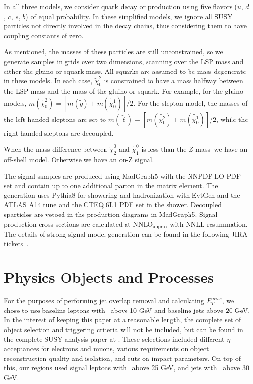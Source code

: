 In all three models, we consider quark decay or production using five flavors ($u$, $d$, $c$, $s$, $b$) of equal probability. In these simplified models, we ignore all SUSY particles not directly involved in the decay chains, thus considering them to have coupling constants of zero.

As mentioned, the masses of these particles are still unconstrained, so we generate samples in grids over two dimensions, scanning over the LSP mass and either the gluino or squark mass. All squarks are assumed to be mass degenerate in these models. In each case, $\tilde{\chi}_0^2$ is constrained to have a mass halfway between the LSP mass and the mass of the gluino or squark. For example, for the gluino models, $m(\tilde{\chi}_0^2) = [m(\tilde{g})+m(\tilde{\chi^1_0})]/2$. For the slepton model, the masses of the left-handed sleptons are set to $m(\tilde{\ell}) = [m(\tilde{\chi^2_0})+m(\tilde{\chi^1_0})]/2$, while the right-handed sleptons are decoupled.

When the mass difference between $\tilde{\chi}_{2}^{0}$ and $\tilde{\chi}_{1}^{0}$ is less than the $Z$ mass, we have an off-shell model. Otherwise we have an on-Z signal.

The signal samples are produced using MadGraph5 with the NNPDF LO PDF set and contain up to one additional parton in the matrix element. The generation uses Pythia8 for showering and hadronization with EvtGen and the ATLAS A14 tune and the CTEQ 6L1 PDF set in the shower. Decoupled sparticles are vetoed in the production diagrams in MadGraph5. Signal production cross sections are calculated at NNLO$_\text{approx}$ with NNLL resummation. The details of strong signal model generation can be found in the following JIRA tickets~\cite{JIRAGluinoSLN, JIRAGluinoZ, JIRASleptonZ}.

\section{Physics Objects and Processes}

For the purposes of performing jet overlap removal and calculating $E_T^{miss}$, we chose to use baseline leptons with \pt\ above 10 GeV and baseline jets above 20 GeV. In the interest of keeping this paper at a reasonable length, the complete set of object selection and triggering criteria will not be included, but can be found in the complete SUSY analysis paper at \cite{SUSY_2l2j}. These selections included different $\eta$ acceptances for electrons and muons, various requirements on object reconstruction quality and isolation, and cuts on impact parameters. On top of this, our regions used signal leptons with \pt\ above 25 GeV, and jets with \pt\ above 30 GeV.

